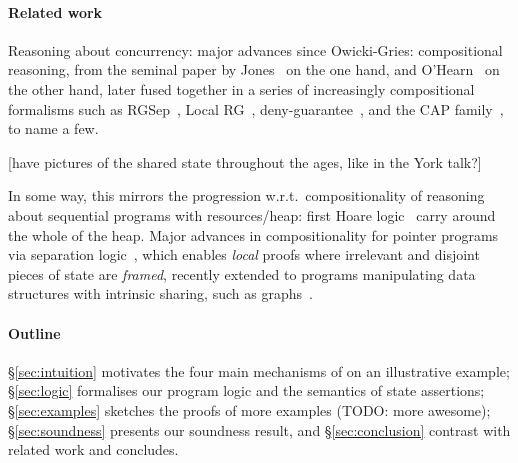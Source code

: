 \paragraph{Related work}
Reasoning about concurrency: major advances since Owicki-Gries:
compositional reasoning, from the seminal paper by Jones~\cite{rg} on
the one hand, and O'Hearn~\cite{csl-orig,csl-tcs} on the other hand,
later fused together in a series of increasingly compositional
formalisms such as RGSep~\cite{viktor-marriage}, Local RG~\cite{lrg},
deny-guarantee~\cite{dg}, and the CAP
family~\cite{cap-ecoop10,icap,tada}, to name a few.

[have pictures of the shared state throughout the ages, like in the
  York talk?]

In some way, this mirrors the progression w.r.t.\ compositionality of
reasoning about sequential programs with resources/heap: first Hoare
logic~\cite{hoarelogic} carry around the whole of the heap. Major
advances in compositionality for pointer programs via separation
logic~\cite{seplog}, which enables \emph{local} proofs where
irrelevant and disjoint pieces of state are \emph{framed}, recently
extended to programs manipulating data structures with intrinsic
sharing, such as graphs~\cite{ramification}.


\paragraph{Outline}
\S\ref{sec:intuition} motivates the four main mechanisms of \colosl on
an illustrative example; \S\ref{sec:logic} formalises our program
logic and the semantics of state assertions; \S\ref{sec:examples}
sketches the proofs of more examples (TODO: more awesome);
\S\ref{sec:soundness} presents our soundness result, and
\S\ref{sec:conclusion} contrast with related work and concludes.
